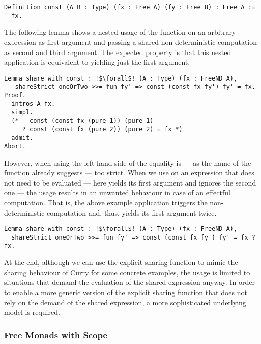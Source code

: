 \begin{verbatim}
Definition const (A B : Type) (fx : Free A) (fy : Free B) : Free A :=
  fx.
\end{verbatim}

The following lemma shows a nested usage of the function  on an arbitrary expression as first argument and passing a shared non\--deterministic computation as second and third argument.
The expected property is that this nested application is equivalent to yielding just the first argument.

\begin{verbatim}
Lemma share_with_const : !$\forall$! (A : Type) (fx : FreeND A),
   shareStrict oneOrTwo >>= fun fy' => const (const fx fy') fy' = fx.
Proof.
  intros A fx.
  simpl.
  (*   const (const fx (pure 1)) (pure 1)
     ? const (const fx (pure 2)) (pure 2) = fx *)
  admit.
Abort.
\end{verbatim}

However, when using  the left\--hand side of the equality is --- as the name of the function already suggests --- too strict.
When we use  on an expression that does not need to be evaluated --- here  yields its first argument and ignores the second one --- the usage results in an unwanted behaviour in case of an effectful computation.
That is, the above example application triggers the non\--deterministic computation  and, thus, yields its first argument  twice.

\begin{verbatim}
Lemma share_with_const : !$\forall$! (A : Type) (fx : FreeND A),
  shareStrict oneOrTwo >>= fun fy' => const (const fx fy') fy' = fx ? fx.
\end{verbatim}

At the end, although we can use the explicit sharing function  to mimic the sharing behaviour of Curry for some concrete examples, the usage is limited to situations that demand the evaluation of the shared expression anyway.
In order to enable a more generic version of the explicit sharing function that does not rely on the demand of the shared expression, a more sophisticated underlying model is required.

\subsubsection{Free Monads with Scope}

